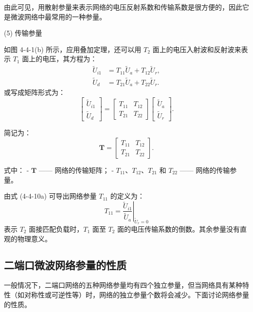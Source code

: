 由此可见，用散射参量来表示网络的电压反射系数和传输系数是很方便的，因此它是微波网络中最常用的一种参量。

(5) 传输参量

如图 4-4-1(b) 所示，应用叠加定理，还可以用 $ T_2 $ 面上的电压入射波和反射波来表示 $ T_1 $ 面上的电压，其方程为：
\begin{equation}
	\begin{aligned}
		\widetilde{U}_{i1} &= T_{11} \widetilde{U}_{a} + T_{12} \widetilde{U}_{r}, \\
		\widetilde{U}_{d} &= T_{21} \widetilde{U}_{a} + T_{22} \widetilde{U}_{r}.
	\end{aligned}
	\tag{4-4-10a}
\end{equation}
或写成矩阵形式为：
\begin{equation}
	\begin{bmatrix}
		\widetilde{U}_{i1} \\
		\widetilde{U}_{d}
	\end{bmatrix}
	=
	\begin{bmatrix}
		T_{11} & T_{12} \\
		T_{21} & T_{22}
	\end{bmatrix}
	\begin{bmatrix}
		\widetilde{U}_{a} \\
		\widetilde{U}_{r}
	\end{bmatrix}.
	\tag{4-4-10b}
\end{equation}

简记为：
\[
\mathbf{T} =
\begin{bmatrix}
	T_{11} & T_{12} \\
	T_{21} & T_{22}
\end{bmatrix}.
\]

式中：
- $\mathbf{T}$ —— 网络的传输矩阵；
- $T_{11}$、$T_{12}$、$T_{21}$ 和 $T_{22}$ —— 网络的传输参量。

由式 (4-4-10a) 可导出网络参量 $T_{11}$ 的定义为：
\[
T_{11} = \left. \frac{\widetilde{U}_{i1}}{\widetilde{U}_{a}} \right|_{\widetilde{U}_{r} = 0}
\]
表示 $T_2$ 面接匹配负载时，$T_1$ 面至 $T_2$ 面的电压传输系数的倒数。其余参量没有直观的物理意义。

\subsection{二端口微波网络参量的性质}

一般情况下，二端口网络的五种网络参量均有四个独立参量，但当网络具有某种特性（如对称性或可逆性等）时，网络的独立参量个数将会减少。下面讨论网络参量的性质。

